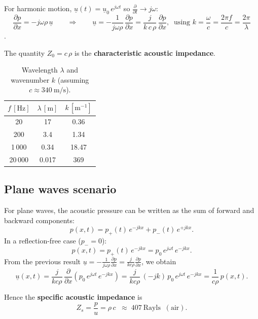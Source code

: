 For harmonic motion, \(\underline{u}(t)=\underline{u}_0\,e^{j\omega t}\) so \(\frac{\partial}{\partial t}\to j\omega\):
\[
\frac{\partial p}{\partial x}=-j\omega \rho\,\underline{u}\qquad\Rightarrow\qquad
\underline{u}=-\frac{1}{j\omega\rho}\,\frac{\partial p}{\partial x}
= \frac{j}{k\,c\,\rho}\,\frac{\partial p}{\partial x},
\ \text{ using } k=\frac{\omega}{c}=\frac{2\pi f}{c}=\frac{2\pi}{\lambda}
\]
.

The quantity \(Z_0=c\,\rho\) is the \textbf{characteristic acoustic impedance}.

\begin{table}[H]
\centering
\caption{Wavelength \(\lambda\) and wavenumber \(k\) (assuming \(c\approx 340~\mathrm{m/s}\)).}
\begin{tabular}{c c c}
\toprule
\(f\,[\mathrm{Hz}]\) & \(\lambda\,[\mathrm{m}]\) & \(k\,[\mathrm{m^{-1}}]\)\\
\midrule
20     & 17     & 0.36 \\
200    & 3.4    & 1.34 \\
1\,000 & 0.34   & 18.47 \\
20\,000& 0.017  & 369 \\
\bottomrule
\end{tabular}
\end{table}




\subsection{Plane waves scenario}

For plane waves, the acoustic pressure can be written as the sum of forward and backward components:
\[
p(x,t)=p_{+}(t)\,e^{-jkx}+p_{-}(t)\,e^{+jkx}.
\]
In a reflection-free case (\(p_{-}=0\)):
\[
p(x,t)=p_{+}(t)\,e^{-jkx}=p_{0}\,e^{j\omega t}\,e^{-jkx}.
\]
From the previous result \(\displaystyle \underline{u}=-\frac{1}{j\omega\rho}\frac{\partial p}{\partial x}=\frac{j}{k c \rho}\frac{\partial p}{\partial x}\), we obtain
\[
\underline{u}(x,t)=\frac{j}{k c \rho}\,\frac{\partial}{\partial x}\!\left(p_{0}\,e^{j\omega t}\,e^{-jkx}\right)
=\frac{j}{k c \rho}\,(-jk)\,p_{0}\,e^{j\omega t}\,e^{-jkx}
=\frac{1}{c\rho}\,p(x,t).
\]

Hence the \textbf{specific acoustic impedance} is
\[
Z_s=\frac{p}{u}= \rho\,c \;\;\approx\; 407~\text{Rayls}\;\;(\text{air}).
\]





































